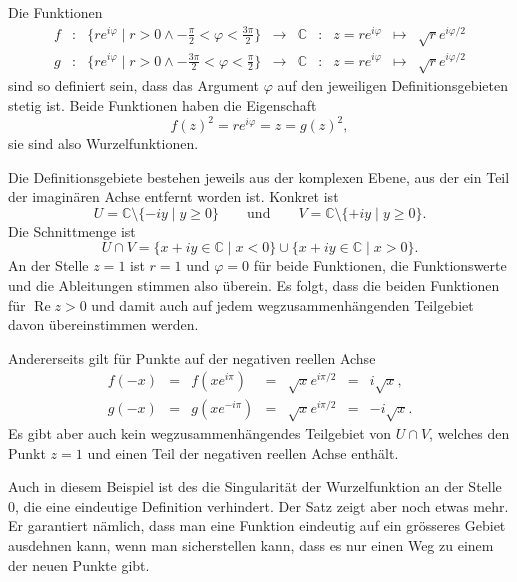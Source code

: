 \begin{beispiel}
Die Funktionen
\begin{equation*}
\renewcommand{\arraycolsep}{2pt}
\begin{array}{rcrclcrcl}
f
&\colon&
\displaystyle
\biggl\{ re^{i\varphi}\mid r > 0\wedge -\frac{\pi}2<\varphi<\frac{3\pi}2 \biggr\}
&\to&
\mathbb{C}
&:&
z=re^{i\varphi}
&\mapsto&
\sqrt{r}e^{i\varphi/2}
\\[7pt]
g
&\colon&
\displaystyle
\biggl\{ re^{i\varphi}\mid r > 0\wedge -\frac{3\pi}2<\varphi<\frac{\pi}2 \biggr\}
&\to&
\mathbb{C}
&:&
z=re^{i\varphi}
&\mapsto&
\sqrt{r}e^{i\varphi/2}
\end{array}
\end{equation*}
sind so definiert sein, dass das Argument $\varphi$ auf den jeweiligen
Definitionsgebieten stetig ist.
Beide Funktionen haben die Eigenschaft
\[
f(z)^2
=
re^{i\varphi} = z
=
g(z)^2,
\]
sie sind also Wurzelfunktionen.

Die Definitionsgebiete bestehen jeweils aus der komplexen Ebene, aus der
ein Teil der imaginären Achse entfernt worden ist.
Konkret ist
\[
U = \mathbb{C}\setminus\{-iy\mid y\ge 0\}
\qquad\text{und}\qquad
V = \mathbb{C}\setminus\{+iy\mid y\ge 0\}.
\]
Die Schnittmenge ist 
\[
U\cap V
=
\{x+iy\in\mathbb{C}\mid x < 0\}
\cup
\{x+iy\in\mathbb{C}\mid x > 0\}.
\]
An der Stelle $z=1$ ist $r=1$ und $\varphi=0$ für beide Funktionen,
die Funktionswerte und die Ableitungen stimmen also überein.
Es folgt, dass die beiden Funktionen für $\operatorname{Re}z>0$
und damit auch auf jedem wegzusammenhängenden Teilgebiet davon
übereinstimmen werden.

Andererseits gilt für Punkte auf der negativen reellen Achse
\[
\renewcommand{\arraycolsep}{2pt}
\begin{array}{rclclcr}
f(-x) &=& f(xe^{i\pi})  &=& \!\sqrt{x}e^{i\pi/2} &=& i\!\sqrt{x},\\
g(-x) &=& g(xe^{-i\pi}) &=& \!\sqrt{x}e^{i\pi/2} &=& -i\!\sqrt{x}.
\end{array}
\]
Es gibt aber auch kein wegzusammenhängendes Teilgebiet von $U\cap V$,
welches den Punkt $z=1$ und einen Teil der negativen reellen Achse
enthält.
\end{beispiel}

Auch in diesem Beispiel ist des die Singularität der Wurzelfunktion
an der Stelle $0$, die eine eindeutige Definition verhindert.
Der Satz zeigt aber noch etwas mehr.
Er garantiert nämlich, dass man eine Funktion eindeutig auf ein
grösseres Gebiet ausdehnen kann, wenn man sicherstellen kann,
dass es nur einen Weg zu einem der neuen Punkte gibt.

